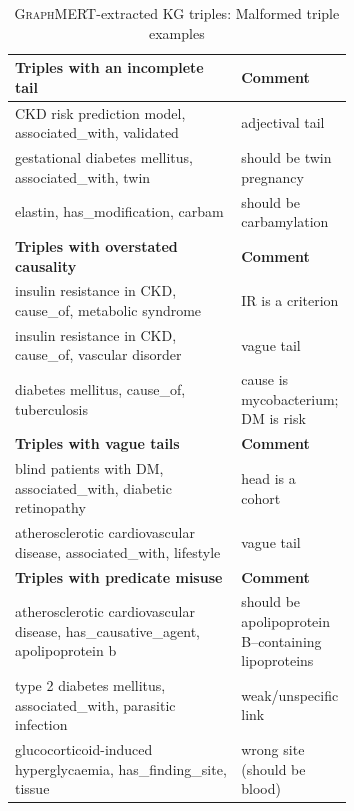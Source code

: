 \documentclass[10pt]{article}
\newcommand{\ours}{\textsc{GraphMERT}\xspace}
\begin{document}
\begin{table}[h]
  \centering
  \caption{\ours-extracted KG triples: Malformed triple examples}
  \label{tab:glm-malformed_triple}
  \small
  \setlength{\tabcolsep}{4pt} %
  \begin{tabularx}{\linewidth}{p{0.67\linewidth} X}
    \toprule
    \rowcolor{gray!30}
    \textbf{Triples with an incomplete tail} & \textbf{Comment} \\
    \midrule
    CKD risk prediction model, associated\_with, validated & adjectival tail\\ 
    gestational diabetes mellitus, associated\_with, twin & should be twin pregnancy \\
    elastin, has\_modification, carbam & should be carbamylation \\
    \midrule
    \rowcolor{gray!30}
    \textbf{Triples with overstated causality} & \textbf{Comment} \\
    \midrule
    insulin resistance in CKD, cause\_of, metabolic syndrome & IR is a criterion \\
    insulin resistance in CKD, cause\_of, vascular disorder & vague tail \\
    diabetes mellitus, cause\_of, tuberculosis & cause is mycobacterium; DM is risk \\
    \midrule
    \rowcolor{gray!30}
    \textbf{Triples with vague tails} & \textbf{Comment} \\
    blind patients with DM, associated\_with, diabetic retinopathy & head is a cohort\\
    atherosclerotic cardiovascular disease, associated\_with, lifestyle & vague tail \\
    \midrule
    \rowcolor{gray!30}
    \textbf{Triples with predicate misuse} & \textbf{Comment} \\
    atherosclerotic cardiovascular disease, has\_causative\_agent, apolipoprotein b & should be apolipoprotein B–containing lipoproteins\\
    type 2 diabetes mellitus, associated\_with, parasitic infection & weak/unspecific link\\
    glucocorticoid-induced hyperglycaemia, has\_finding\_site, tissue & wrong site (should be blood) \\
    \bottomrule
  \end{tabularx}
\end{table}
\end{document}
